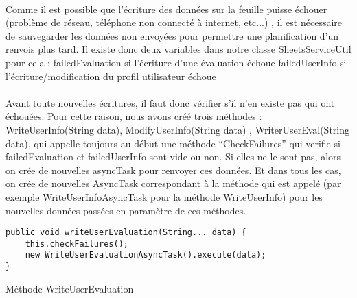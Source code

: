 \documentclass[../main.tex]{subfiles}
\begin{document}
\paragraph{}
Comme il est possible que l’écriture des données sur la feuille puisse échouer (problème de réseau, téléphone non connecté à internet, etc...) , il est nécessaire de sauvegarder les données non envoyées pour permettre une planification d’un renvois plus tard. Il existe donc deux variables dans notre classe SheetsServiceUtil pour cela : 
failedEvaluation si l’écriture d’une évaluation échoue
failedUserInfo si l’écriture/modification du profil utilisateur échoue
\paragraph{}
Avant toute nouvelles écritures, il faut donc vérifier s’il n’en existe pas qui ont échouées.
Pour cette raison, nous avons créé trois méthodes : WriteUserInfo(String data), ModifyUserInfo(String data) , WriterUserEval(String data), qui appelle toujours au début une méthode “CheckFailures” qui verifie si failedEvaluation et failedUserInfo sont vide ou non. Si elles ne le sont pas, alors on crée de nouvelles asyncTask pour renvoyer ces données. Et dans tous les cas, on crée de nouvelles AsyncTask correspondant à la méthode qui est appelé (par exemple WriteUserInfoAsyncTask pour la méthode WriteUserInfo) pour les nouvelles données passées en paramètre de ces méthodes.
\hfill \break
\begin{lstlisting}[tabsize=3]
public void writeUserEvaluation(String... data) {
	this.checkFailures();
	new WriteUserEvaluationAsyncTask().execute(data);
}
\end{lstlisting}
Méthode WriteUserEvaluation
	
\end{document}
